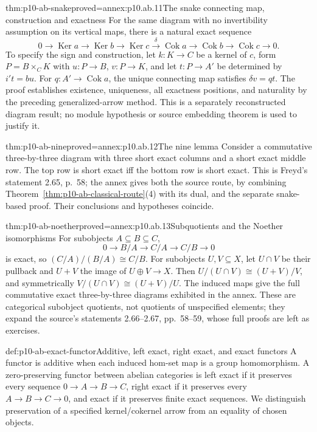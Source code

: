\begin{hbtheorem}{thm:p10-ab-snake}{proved=annex:p10.ab.11}{The snake connecting map, construction and exactness}
For the same diagram with no invertibility assumption on its vertical
maps, there is a natural exact sequence
\[
 0\to\operatorname{Ker}a\to\operatorname{Ker}b\to
 \operatorname{Ker}c\xrightarrow{\delta}\operatorname{Cok}a\to
 \operatorname{Cok}b\to\operatorname{Cok}c\to0.
\]
To specify the sign and construction, let \(k:K\to C\) be a kernel
of \(c\), form \(P=B\times_C K\) with \(u:P\to B\), \(v:P\to K\),
and let \(t:P\to A'\) be determined by \(i't=bu\).
For \(q:A'\to\operatorname{Cok}a\), the unique connecting map satisfies
\(\delta v=qt\). The proof establishes existence, uniqueness, all
exactness positions, and naturality by the preceding generalized-arrow
method. This is a separately reconstructed diagram result; no module
hypothesis or source embedding theorem is used to justify it.
\end{hbtheorem}

\begin{hbtheorem}{thm:p10-ab-nine}{proved=annex:p10.ab.12}{The nine lemma}
Consider a commutative three-by-three diagram with three short exact
columns and a short exact middle row. The top row is short exact iff
the bottom row is short exact. This is Freyd's statement 2.65, p.~58;
the annex gives both the source route, by combining
Theorem~\ref{thm:p10-ab-classical-route}(4) with its dual, and the
separate snake-based proof. Their conclusions and hypotheses coincide.
\end{hbtheorem}

\begin{hbtheorem}{thm:p10-ab-noether}{proved=annex:p10.ab.13}{Subquotients and the Noether isomorphisms}
For subobjects \(A\subseteq B\subseteq C\),
\[
 0\to B/A\to C/A\to C/B\to0
\]
is exact, so \((C/A)/(B/A)\cong C/B\).
For subobjects \(U,V\subseteq X\), let \(U\cap V\) be their
pullback and \(U+V\) the image of \(U\oplus V\to X\). Then
\(U/(U\cap V)\cong(U+V)/V\), and symmetrically
\(V/(U\cap V)\cong(U+V)/U\). The induced maps give the full
commutative exact three-by-three diagrams exhibited in the annex.
These are categorical subobject quotients, not quotients of unspecified
elements; they expand the source's
statements 2.66--2.67, pp.~58--59, whose full proofs are left as exercises.
\end{hbtheorem}

\begin{hbdefinition}{def:p10-ab-exact-functor}{Additive, left exact, right exact, and exact functors}
A functor is additive when each induced hom-set map is a group
homomorphism. A zero-preserving functor between abelian categories is
left exact if it preserves every sequence \(0\to A\to B\to C\),
right exact if it preserves every \(A\to B\to C\to0\), and exact
if it preserves finite exact sequences. We distinguish preservation of
a specified kernel/cokernel arrow from an equality of chosen objects.
\end{hbdefinition}

